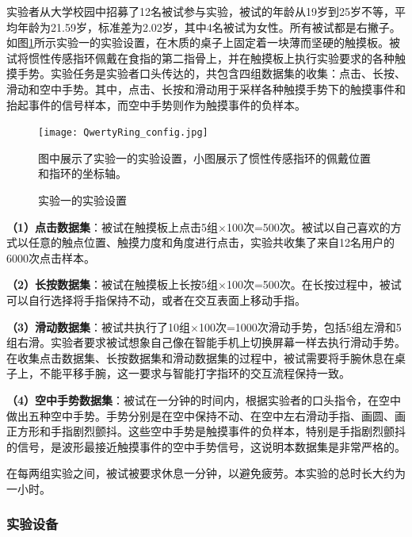 实验者从大学校园中招募了12名被试参与实验，被试的年龄从19岁到25岁不等，平均年龄为21.59岁，标准差为2.02岁，其中4名被试为女性。所有被试都是右撇子。如图\ref{fig:QwertyRing_config}所示实验一的实验设置，在木质的桌子上固定着一块薄而坚硬的触摸板。被试将惯性传感指环佩戴在食指的第二指骨上，并在触摸板上执行实验要求的各种触摸手势。实验任务是实验者口头传达的，共包含四组数据集的收集：点击、长按、滑动和空中手势。其中，点击、长按和滑动用于采样各种触摸手势下的触摸事件和抬起事件的信号样本，而空中手势则作为触摸事件的负样本。

\begin{figure}
	\centering
	\texttt{[image: QwertyRing\_config.jpg]}
	\caption*{图中展示了实验一的实验设置，小图展示了惯性传感指环的佩戴位置和指环的坐标轴。}
	\caption{实验一的实验设置}
	\label{fig:QwertyRing_config}
\end{figure}

\textbf{（1）点击数据集}：被试在触摸板上点击5组$\times$100次=500次。被试以自己喜欢的方式以任意的触点位置、触摸力度和角度进行点击，实验共收集了来自12名用户的6000次点击样本。

\textbf{（2）长按数据集}：被试在触摸板上长按5组$\times$100次=500次。在长按过程中，被试可以自行选择将手指保持不动，或者在交互表面上移动手指。

\textbf{（3）滑动数据集}：被试共执行了10组$\times$100次=1000次滑动手势，包括5组左滑和5组右滑。实验者要求被试想象自己像在智能手机上切换屏幕一样去执行滑动手势。在收集点击数据集、长按数据集和滑动数据集的过程中，被试需要将手腕休息在桌子上，不能平移手腕，这一要求与智能打字指环的交互流程保持一致。

\textbf{（4）空中手势数据集}：被试在一分钟的时间内，根据实验者的口头指令，在空中做出五种空中手势。手势分别是在空中保持不动、在空中左右滑动手指、画圆、画正方形和手指剧烈颤抖。这些空中手势是触摸事件的负样本，特别是手指剧烈颤抖的信号，是波形最接近触摸事件的空中手势信号，这说明本数据集是非常严格的。

在每两组实验之间，被试被要求休息一分钟，以避免疲劳。本实验的总时长大约为一小时。

\subsubsection{实验设备}

